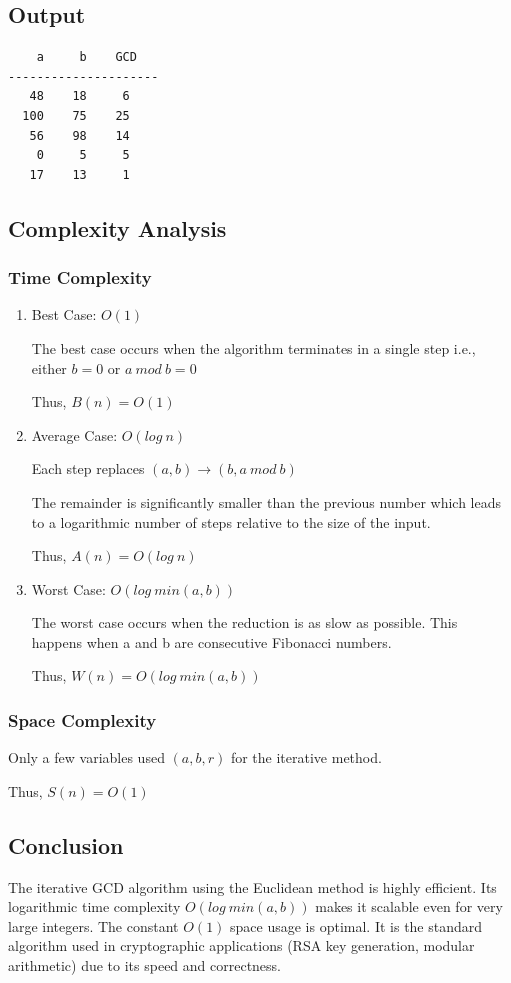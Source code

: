 \documentclass{article}
\begin{document}
\subsection*{Output}
\begin{verbatim}
    a     b    GCD
---------------------
   48    18     6
  100    75    25
   56    98    14
    0     5     5
   17    13     1
\end{verbatim}

\subsection*{Complexity Analysis}

\subsubsection*{Time Complexity}

\begin{enumerate}
    \item Best Case: $O(1)$

          The best case occurs when the algorithm terminates in a single step i.e., either $b = 0$ or $a \: mod \: b = 0$

          Thus, $B(n) = O(1)$

    \item Average Case: $O(log\:n)$

          Each step replaces $(a,b) \rightarrow  (b,a\:mod\:b)$

          The remainder is significantly smaller than the previous number which leads to a logarithmic number of steps relative to the size of the input.

          Thus, $A(n) = O(log\:n)$

    \item Worst Case: $O(log\:min(a, b))$

          The worst case occurs when the reduction is as slow as possible. This happens when a and b are consecutive Fibonacci numbers.

          Thus, $W(n) = O(log\:min(a, b))$
\end{enumerate}

\subsubsection*{Space Complexity}
Only a few variables used $(a, b, r)$ for the iterative method.

Thus, $S(n) = O(1)$

\subsection*{Conclusion}
The iterative GCD algorithm using the Euclidean method is highly efficient. Its logarithmic time complexity $O(log\:min(a,b))$ makes it scalable even for very large integers. The constant $O(1)$ space usage is optimal. It is the standard algorithm used in cryptographic applications (RSA key generation, modular arithmetic) due to its speed and correctness.
\end{document}
